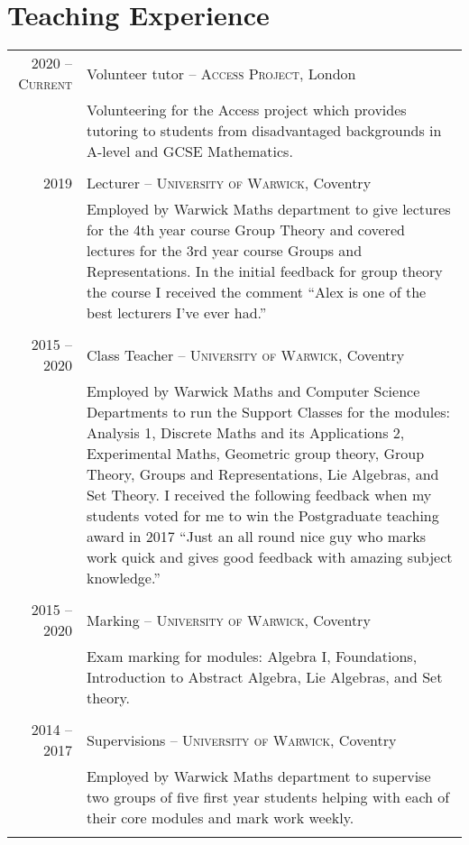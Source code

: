 \documentclass[a4paper,10pt]{article}
\begin{document}
\section{Teaching Experience}
\begin{tabular}{r|p{15cm}}
\textsc{2020 -- Current} & Volunteer tutor -- \textsc{Access Project}, London\\&\footnotesize{Volunteering for the Access project which provides tutoring to students from disadvantaged backgrounds in A-level and GCSE Mathematics.}\\\multicolumn{2}{c}{} \\
\textsc{2019} & Lecturer -- \textsc{University of Warwick}, Coventry\\&\footnotesize{Employed by Warwick Maths department to give lectures for the 4th year course Group Theory and covered lectures for the 3rd year course Groups and Representations. In the initial feedback for group theory the course I received the comment ``Alex is one of the best lecturers I've ever had.''}\\\multicolumn{2}{c}{} \\
\textsc{2015 -- 2020} & Class Teacher -- \textsc{University of Warwick}, Coventry\\&\footnotesize{Employed by Warwick Maths and Computer Science Departments to run the Support Classes for the modules: Analysis 1, Discrete Maths and its Applications 2, Experimental Maths, Geometric group theory, Group Theory, Groups and Representations, Lie Algebras, and Set Theory. I received the following feedback when my students voted for me to win the Postgraduate teaching award in 2017 ``Just an all round nice guy who marks work quick and gives good feedback with amazing subject knowledge.''}\\\multicolumn{2}{c}{} \\
\textsc{2015 -- 2020}& Marking -- \textsc{University of Warwick}, Coventry\\&\footnotesize{Exam marking for modules: Algebra I, Foundations, Introduction to Abstract Algebra, Lie Algebras, and Set theory.}\\\multicolumn{2}{c}{} \\
\textsc{2014 -- 2017} & Supervisions -- \textsc{University of Warwick}, Coventry\\&\footnotesize{Employed by Warwick Maths department to supervise two groups of five first year students helping with each of their core modules and mark work weekly.}\\\multicolumn{2}{c}{} \\

\end{tabular}
\end{document}
